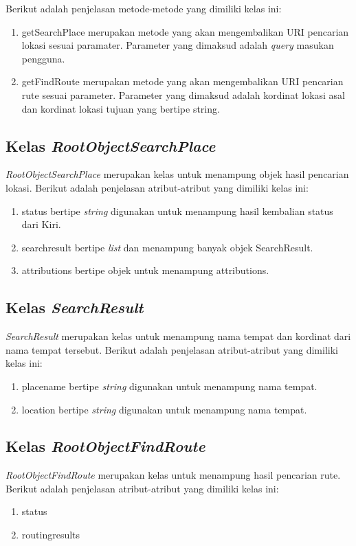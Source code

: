 Berikut adalah penjelasan metode-metode yang dimiliki kelas ini:
\begin{enumerate}
	\item getSearchPlace merupakan metode yang akan mengembalikan URI pencarian lokasi sesuai paramater. Parameter yang dimaksud adalah \textit{query} masukan pengguna.
	\item getFindRoute merupakan metode yang akan mengembalikan URI pencarian rute sesuai parameter. Parameter yang dimaksud adalah kordinat lokasi asal dan kordinat lokasi tujuan yang bertipe string.
\end{enumerate}

\subsection{Kelas \textit{RootObjectSearchPlace}}
\label{lab:Kelas RootObjectSearchPlace}
\hspace{0.5cm} \textit{RootObjectSearchPlace} merupakan kelas untuk menampung objek hasil pencarian lokasi. Berikut adalah penjelasan atribut-atribut yang dimiliki kelas ini:
\begin{enumerate}
	\item status bertipe \textit{string} digunakan untuk menampung hasil kembalian status dari Kiri.
	\item searchresult bertipe \textit{list} dan menampung banyak objek SearchResult. 
	\item attributions bertipe objek untuk menampung attributions.
\end{enumerate}


\subsection{Kelas \textit{SearchResult}}
\label{lab:Kelas SearchResult}
\hspace{0.5cm} \textit{SearchResult} merupakan kelas untuk menampung nama tempat dan kordinat dari nama tempat tersebut. Berikut adalah penjelasan atribut-atribut yang dimiliki kelas ini:
\begin{enumerate}
	\item placename bertipe \textit{string} digunakan untuk menampung nama tempat. 
	\item location bertipe \textit{string} digunakan untuk menampung nama tempat.
\end{enumerate}

\subsection{Kelas \textit{RootObjectFindRoute}}
\label{lab:Kelas RootObjectFindRoute}
\hspace{0.5cm} \textit{RootObjectFindRoute} merupakan kelas untuk menampung hasil pencarian rute. Berikut adalah penjelasan atribut-atribut yang dimiliki kelas ini:
\begin{enumerate}
	\item status
	\item routingresults
\end{enumerate}

